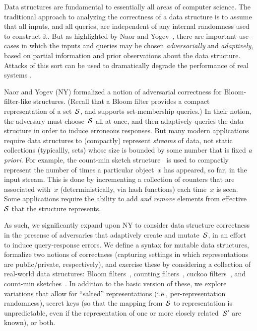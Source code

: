 
%
Data structures are fundamental to essentially all areas of computer science.  
The traditional approach to analyzing the correctness of a data structure 
is to assume that all inputs, and all queries, 
are independent of any internal randomness used to construct it. 
But as highlighted by Naor and
Yogev~\cite{naor2015bloom}, there are important use-cases in which the inputs and queries
may be chosen \emph{adversarially} and \emph{adaptively}, based on partial
information and prior observations about the data structure. Attacks of this
sort can be used to dramatically degrade the performance of real systems
\cite{crosby2003denial,gerbet2015power,lipton1993clocked}.

Naor and Yogev (NY) formalized a notion of adversarial correctness for
Bloom-filter-like structures. (Recall that
a Bloom filter provides a compact representation of a set~$\mathcal{S}$, and supports
set-membership queries.)
In their notion, the adversary must choose~$\mathcal{S}$ all at once,
and then adaptively queries the data structure in order to induce
erroneous responses. 
%
But many modern applications require data structures to (compactly) represent \emph{streams} of
data, not static collections (typicallly, sets) whose size is bounded by some number that is
fixed \emph{a priori}.  
%
For example, the count-min
sketch structure~\cite{xxx} is used to compactly represent the number
of times a particular object~$x$ has appeared, so far, in the input
stream.  This is done by incrementing a collection of counters that
are associated with~$x$ (deterministically, via hash functions) each
time~$x$ is seen.  Some applications require the ability to
add \emph{and remove} elements from effective~$\mathcal{S}$ that the structure
represents.  

As such, we significantly expand upon NY to consider data structure
correctness in the presense of adversaries that adaptively create and
mutate~$\mathcal{S}$, in an effort to induce query-response errors.  We
define a syntax for mutable data structures, formalize two notions of
correctness (capturing settings in which representations
are public/private, respectively), and exercise these by
considering a collection of real-world data structures: Bloom
filters~\cite{xxx}, counting filters~\cite{xxx}, cuckoo
filters~\cite{xxx}, and count-min sketches~\cite{xxx}.   In addition to the basic version of these, we
explore variations that allow for ``salted'' representations (i.e.,
per-representation randomness), secret keys (so that the mapping
from~$\mathcal{S}$ to representation is unpredictable, even if the
representation of one or more closely related~$\mathcal{S}'$ are known), or both.

